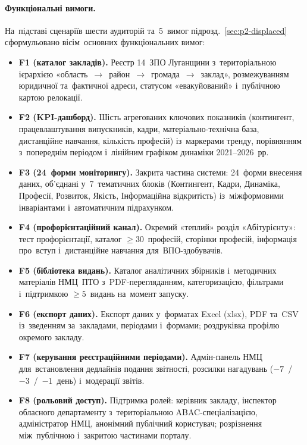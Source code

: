 \paragraph*{\textbf{Функціональні вимоги.}}
\label{sec:p2-req-functional}

На~підставі сценаріїв шести аудиторій та~5~вимог підрозд.~\ref{sec:p2-displaced} сформульовано вісім~основних функціональних вимог:

\begin{itemize}
    \item \textbf{F1 (каталог закладів).} Реєстр 14~ЗПО Луганщини з~територіальною ієрархією «область~$\to$~район~$\to$~громада~$\to$~заклад», розмежуванням юридичної та~фактичної адреси, статусом «евакуйований» і~публічною картою релокації.
    \item \textbf{F2 (KPI-дашборд).} Шість агрегованих ключових показників (контингент, працевлаштування випускників, кадри, матеріально-технічна база, дистанційне навчання, кількість професій) із~маркерами тренду, порівнянням з~попереднім періодом і~лінійним графіком динаміки 2021--2026~рр.
    \item \textbf{F3 (24~форми моніторингу).} Закрита частина системи: 24~форми внесення даних, об'єднані у~7~тематичних блоків (Контингент, Кадри, Динаміка, Професії, Розвиток, Якість, Інформаційна відкритість) із~міжформовими інваріантами і~автоматичним підрахунком.
    \item \textbf{F4 (профорієнтаційний канал).} Окремий «теплий» розділ «Абітурієнту»: тест профорієнтації, каталог $\geq 30$~професій, сторінки професій, інформація про~вступ і~дистанційне навчання для~ВПО-здобувачів.
    \item \textbf{F5 (бібліотека видань).} Каталог аналітичних збірників і~методичних матеріалів НМЦ~ПТО з~PDF-перегляданням, категоризацією, фільтрами і~підтримкою $\geq 5$~видань на~момент запуску.
    \item \textbf{F6 (експорт даних).} Експорт даних у~форматах Excel (xlsx), PDF та~CSV із~зведенням за~закладами, періодами і~формами; роздруківка профілю окремого закладу.
    \item \textbf{F7 (керування реєстраційними періодами).} Адмін-панель НМЦ для~встановлення дедлайнів подання звітності, розсилки нагадувань ($-7$~/~$-3$~/~$-1$~день) і~модерації звітів.
    \item \textbf{F8 (рольовий доступ).} Підтримка ролей: керівник закладу, інспектор обласного департаменту з~територіальною ABAC-спеціалізацією, адміністратор НМЦ, анонімний публічний користувач; розрізнення між~публічною і~закритою частинами порталу.
\end{itemize}


